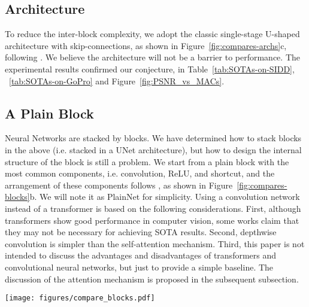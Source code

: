 \documentclass[runningheads]{llncs}
\begin{document}
\subsection {Architecture}
To reduce the inter-block complexity, we adopt the classic single-stage U-shaped architecture with skip-connections, as shown in Figure~\ref{fig:compares-archs}c, following \cite{zamir2021restormer,wang2021uformer}. We believe the architecture will not be a barrier to performance. The experimental results confirmed our conjecture, in Table~\ref{tab:SOTAs-on-SIDD}, ~\ref{tab:SOTAs-on-GoPro} and Figure~\ref{fig:PSNR_vs_MACs}. 



\subsection{A Plain Block}
Neural Networks are stacked by blocks. We have determined how to stack blocks in the above (i.e. stacked in a UNet architecture), but how to design the internal structure of the block is still a problem. We start from a plain block with the most common components, i.e. convolution, ReLU, and shortcut\cite{he2016deep}, and the arrangement of these components follows \cite{han2021demystifying,liu2021swin}, as shown in Figure~\ref{fig:compares-blocks}b. We will note it as PlainNet for simplicity. Using a convolution network instead of a transformer is based on the following considerations. First, although transformers show good performance in computer vision, some works\cite{han2021demystifying,liu2022convnet} claim that they may not be necessary for achieving SOTA results. Second, depthwise convolution is simpler than the self-attention\cite{vaswani2017attention} mechanism. Third, this paper is not intended to discuss the advantages and disadvantages of transformers and convolutional neural networks, but just to provide a simple baseline. The discussion of the attention mechanism is proposed in the subsequent subsection. 

\begin{figure*}[!t]
\texttt{[image: figures/compare\_blocks.pdf]}
\caption{Intra-block structure comparison. $\otimes$:matrix multiplication, $\odot$/$\oplus$:element-wise multiplication/addition. dconv: Depthwise convolution. Nonlinear activation functions are represented by yellow boxes. (a) Restormer's block\cite{zamir2021restormer}, some details are omitted for simplicity, e.g. reshaping the feature maps. (b) PlainNet's block, which contains the most common components. (c) Our proposed baseline. Compares to (b), Channel Attention (CA) and LayerNorm are adopted. Besides, ReLU is replaced by GELU. (d) Our proposed Nonlinear Activation Free Network's block. It replaces CA/GELU with Simplified Channel Attention(SCA) and SimpleGate respectively. The details of these components are shown in Fig~\ref{fig:OurModules}}
\label{fig:compares-blocks}
\end{figure*}
\end{document}
